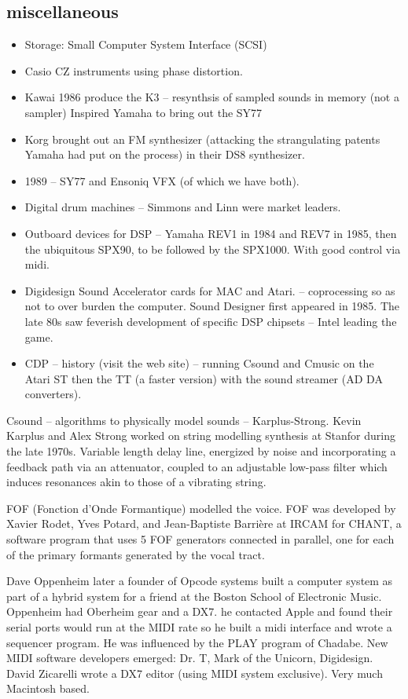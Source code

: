 \subsection{miscellaneous}
\begin{itemize}
\item Storage: Small Computer System Interface (SCSI)
\item Casio CZ instruments using phase distortion.
\item Kawai 1986 produce the K3 – resynthsis of sampled sounds in memory (not a sampler) Inspired Yamaha to bring out the SY77
\item Korg brought out an FM synthesizer (attacking the strangulating patents Yamaha had put on the process) in their DS8 synthesizer. 
\item 1989 – SY77 and Ensoniq VFX (of which we have both).
\item Digital drum machines – Simmons and Linn were market leaders.
\item Outboard devices for DSP – Yamaha REV1 in 1984 and REV7 in 1985, then the ubiquitous SPX90, to be followed by the SPX1000. With good control via midi.
\item Digidesign Sound Accelerator cards for MAC and Atari. – coprocessing so as not to over burden the computer. Sound Designer first appeared in 1985.  The late 80s saw feverish development of specific DSP chipsets – Intel leading the game.
\item CDP – history (visit the web site) – running Csound and Cmusic on the Atari ST then the TT (a faster version) with the sound streamer (AD DA converters). 
\end{itemize}

Csound – algorithms to physically model sounds – Karplus-Strong. Kevin Karplus and Alex Strong worked on string modelling synthesis at Stanfor during the late 1970s.  Variable length delay line, energized by noise and incorporating a feedback path via an attenuator, coupled to an adjustable low-pass filter which induces resonances akin to those of a vibrating string. 

FOF (Fonction d’Onde Formantique) modelled the voice.  FOF was developed by Xavier Rodet, Yves Potard, and Jean-Baptiste Barrière at IRCAM for CHANT, a software program that uses 5 FOF generators connected in parallel, one for each of the primary formants generated by the vocal tract.  

Dave Oppenheim later a founder of Opcode systems built a computer system as part of a hybrid system for a friend at the Boston School of Electronic Music.  Oppenheim had Oberheim gear and a DX7. he contacted Apple and found their serial ports would run at the MIDI rate so he built a midi interface and wrote a sequencer program.  He was influenced by the PLAY program of Chadabe.  New MIDI software developers emerged: Dr. T, Mark of the Unicorn, Digidesign. David Zicarelli wrote a DX7 editor (using MIDI system exclusive).  Very much Macintosh based.

